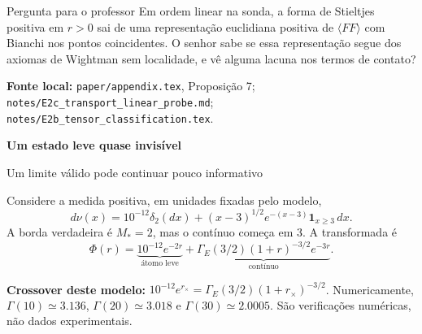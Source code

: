 \documentclass[11pt,a4paper]{article}
\newcommand{\titlepageof}[3]{\vspace*{2mm}{\small\color{rust}\textbf{#1}}\par
 {\LARGE\bfseries\color{ink}#2}\par{\large #3}\par\vspace{2mm}}
\newcommand{\source}[1]{\vfill{\footnotesize\raggedright\color{ink}\textbf{Fonte local:} #1\par}}
\newcommand{\M}{M_*}
\begin{document}
\begin{panel}{Pergunta para o professor}
Em ordem linear na sonda, a forma de Stieltjes positiva em $r>0$ sai de uma
representação euclidiana positiva de $\langle FF\rangle$ com Bianchi nos
pontos coincidentes. O senhor sabe se essa representação segue dos axiomas
de Wightman sem localidade, e vê alguma lacuna nos termos de contato?
\end{panel}
\source{\texttt{paper/appendix.tex}, Proposição 7; \texttt{notes/E2c\_transport\_linear\_probe.md};
\texttt{notes/E2b\_tensor\_classification.tex}.}
\newpage
\titlepageof{03 / CONTRAEXEMPLO}{Um estado leve quase invisível}{Um limite válido pode continuar pouco informativo}
Considere a medida positiva, em unidades fixadas pelo modelo,
\begin{equation*}
 d\nu(x)=10^{-12}\delta_2(dx)+(x-3)^{1/2}e^{-(x-3)}\mathbf1_{x\ge3}\,dx.
\end{equation*}
A borda verdadeira é $\M=2$, mas o contínuo começa em $3$. A transformada é
\begin{equation*}
 \Phi(r)=\underbrace{10^{-12}e^{-2r}}_{\text{átomo leve}}
 +\underbrace{\Gamma_E(3/2)(1+r)^{-3/2}e^{-3r}}_{\text{contínuo}}.
\end{equation*}
\begin{center}
\end{center}
\textbf{Crossover deste modelo:}
$10^{-12}e^{r_\times}=\Gamma_E(3/2)(1+r_\times)^{-3/2}$.
Numericamente, $\Gamma(10)\simeq3.136$, $\Gamma(20)\simeq3.018$ e
$\Gamma(30)\simeq2.0005$. São verificações numéricas, não dados experimentais.
\end{document}
